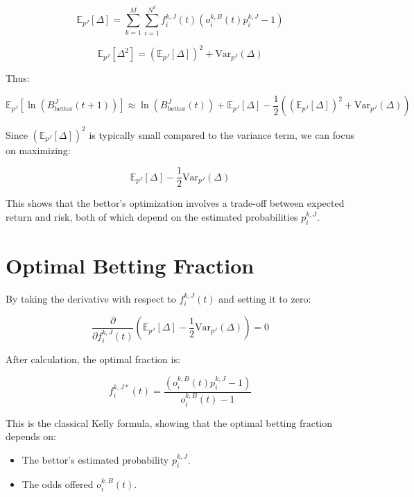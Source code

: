 \[
\mathbb{E}_{p^{J}}\left[ \Delta \right] = \sum_{k=1}^M \sum_{i=1}^{N^k} f_i^{k,J}(t) \left( o_i^{k,B}(t) p_i^{k,J} - 1 \right)
\]

\[
\mathbb{E}_{p^{J}}\left[ \Delta^2 \right] = \left( \mathbb{E}_{p^{J}}\left[ \Delta \right] \right)^2 + \text{Var}_{p^{J}}\left( \Delta \right)
\]

Thus:

\[
\mathbb{E}_{p^{J}}\left[ \ln\left( B_{\text{bettor}}^J(t+1) \right) \right] \approx \ln\left( B_{\text{bettor}}^J(t) \right) + \mathbb{E}_{p^{J}}\left[ \Delta \right] - \frac{1}{2} \left( \left( \mathbb{E}_{p^{J}}\left[ \Delta \right] \right)^2 + \text{Var}_{p^{J}}\left( \Delta \right) \right)
\]

Since \( \left( \mathbb{E}_{p^{J}}\left[ \Delta \right] \right)^2 \) is typically small compared to the variance term, we can focus on maximizing:

\[
\mathbb{E}_{p^{J}}\left[ \Delta \right] - \frac{1}{2} \text{Var}_{p^{J}}\left( \Delta \right)
\]

This shows that the bettor's optimization involves a trade-off between expected return and risk, both of which depend on the estimated probabilities \( p_i^{k,J} \).

\section{Optimal Betting Fraction}

By taking the derivative with respect to \( f_i^{k,J}(t) \) and setting it to zero:

\[
\frac{\partial}{\partial f_i^{k,J}(t)} \left( \mathbb{E}_{p^{J}}\left[ \Delta \right] - \frac{1}{2} \text{Var}_{p^{J}}\left( \Delta \right) \right) = 0
\]

After calculation, the optimal fraction is:

\[
f_i^{k,J*}(t) = \frac{ \left( o_i^{k,B}(t) p_i^{k,J} - 1 \right ) }{ o_i^{k,B}(t) - 1 }
\]

This is the classical Kelly formula, showing that the optimal betting fraction depends on:

\begin{itemize}
    \item The bettor's estimated probability \( p_i^{k,J} \).
    \item The odds offered \( o_i^{k,B}(t) \).
\end{itemize}
